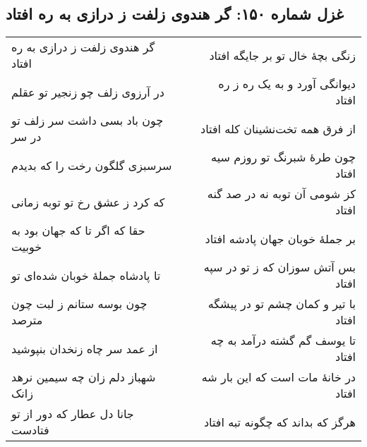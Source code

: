 \begin{center}
\section*{غزل شماره ۱۵۰: گر هندوی زلفت ز درازی به ره افتاد}
\label{sec:150}
\begin{longtable}{l p{0.5cm} r}
گر هندوی زلفت ز درازی به ره افتاد
&&
زنگی بچهٔ خال تو بر جایگه افتاد
\\
در آرزوی زلف چو زنجیر تو عقلم
&&
دیوانگی آورد و به یک ره ز ره افتاد
\\
چون باد بسی داشت سر زلف تو در سر
&&
از فرق همه تخت‌نشینان کله افتاد
\\
سرسبزی گلگون رخت را که بدیدم
&&
چون طرهٔ شبرنگ تو روزم سیه افتاد
\\
که کرد ز عشق رخ تو توبه زمانی
&&
کز شومی آن توبه نه در صد گنه افتاد
\\
حقا که اگر تا که جهان بود به خوبیت
&&
بر جملهٔ خوبان جهان پادشه افتاد
\\
تا پادشاه جملهٔ خوبان شده‌ای تو
&&
بس آتش سوزان که ز تو در سپه افتاد
\\
چون بوسه ستانم ز لبت چون مترصد
&&
با تیر و کمان چشم تو در پیشگه افتاد
\\
از عمد سر چاه زنخدان بنپوشید
&&
تا یوسف گم گشته درآمد به چه افتاد
\\
شهباز دلم زان چه سیمین نرهد زانک
&&
در خانهٔ مات است که این بار شه افتاد
\\
جانا دل عطار که دور از تو فتادست
&&
هرگز که بداند که چگونه تبه افتاد
\\
\end{longtable}
\end{center}
